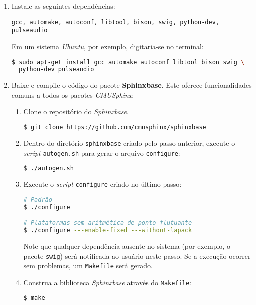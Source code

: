 \begin{enumerate}
\item Instale as seguintes dependências:

\begin{center}
\footnotesize\texttt{gcc, automake, autoconf, libtool, bison, swig, python-dev, pulseaudio}
\end{center}

Em um sistema \emph{Ubuntu}, por exemplo, digitaria-se no terminal:

\begin{lstlisting}[language=Bash]
$ sudo apt-get install gcc automake autoconf libtool bison swig \
  python-dev pulseaudio
\end{lstlisting}

\item Baixe e compile o código do pacote \textbf{Sphinxbase}. Este oferece funcionalidades comuns a todos os pacotes \textit{CMUSphinx}:

\begin{enumerate}
\item Clone o repositório do \textit{Sphinxbase}.

\begin{lstlisting}[language=Bash]
$ git clone https://github.com/cmusphinx/sphinxbase
\end{lstlisting}

\item Dentro do diretório \texttt{sphinxbase} criado pelo passo anterior, execute o \textit{script} \texttt{autogen.sh} para gerar o arquivo \texttt{configure}:

\begin{lstlisting}[language=Bash]
$ ./autogen.sh
\end{lstlisting}

\item Execute o \textit{script} \texttt{configure} criado no último passo:

\begin{lstlisting}[language=Bash]
# Padrão
$ ./configure

# Plataformas sem aritmética de ponto flutuante
$ ./configure ---enable-fixed ---without-lapack
\end{lstlisting}

Note que qualquer dependência ausente no sistema (por exemplo, o pacote \texttt{swig}) será notificada ao usuário neste passo. Se a execução ocorrer sem problemas, um \texttt{Makefile} será gerado.

\item Construa a biblioteca \textit{Sphinxbase} através do \texttt{Makefile}:
\begin{lstlisting}[language=Bash]
$ make
\end{lstlisting}
\end{enumerate}


\end{enumerate}
